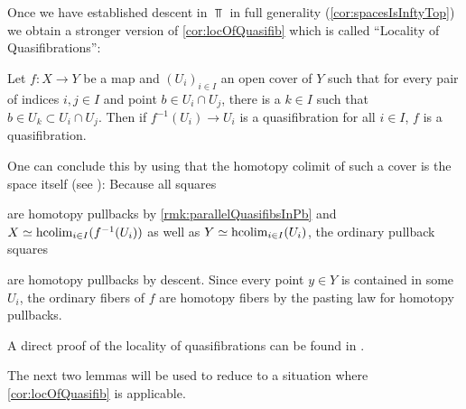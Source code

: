 \begin{remark}\label{rmk:locOfQuasifibDescent}
    Once we have established descent in $\Top$ in full generality (\cref{cor:spacesIsInftyTop}) we obtain a stronger version of \cref{cor:locOfQuasifib} which is called ``Locality of Quasifibrations'':
    
    Let $f\colon X\to Y$ be a map and $(U_i)_{i\in I}$ an open cover of $Y$ such that for every pair of indices $i,j\in I$ and point $b\in U_i\cap U_j$, there is a $k\in I$ such that $b\in U_k\subset U_i\cap U_j$.
    Then if $f^{-1}(U_i)\to U_i$ is a quasifibration for all $i\in I$, $f$ is a quasifibration.

    One can conclude this by using that the homotopy colimit of such a cover is the space itself (see \cite[Proposition 4.6 (c)]{hypercovers}):
    Because all squares
    \begin{center}
    \end{center}
    are homotopy pullbacks by \cref{rmk:parallelQuasifibsInPb} and $X\simeq\operatorname{hcolim}\limits_{i\in I}(f^{-1}(U_i))$ as well as $Y\simeq\operatorname{hcolim}\limits_{i\in I}(U_i)$, the ordinary pullback squares 
    \begin{center}
    \end{center}
    are homotopy pullbacks by descent.
    Since every point $y\in Y$ is contained in some $U_i$, the ordinary fibers of $f$ are homotopy fibers by the pasting law for homotopy pullbacks. 

    A direct proof of the locality of quasifibrations can be found in \cite[Theorem A.1.2]{aguilar2002algebraic}.
\end{remark}
The next two lemmas will be used to reduce to a situation where \cref{cor:locOfQuasifib} is applicable.
